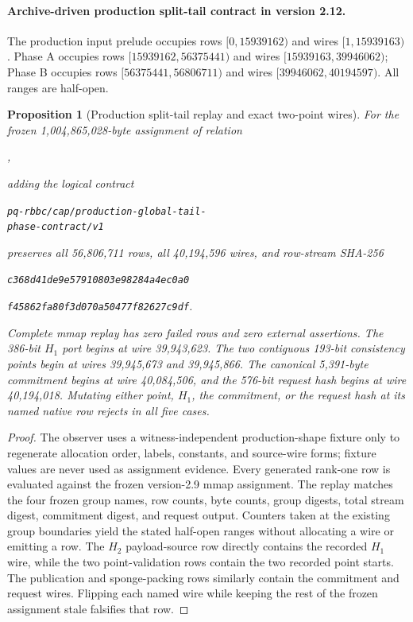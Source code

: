 \documentclass[11pt]{article}
\newtheorem{proposition}[definition]{Proposition}
\begin{document}
\paragraph{Archive-driven production split-tail contract in version 2.12.}
The production input prelude occupies rows $[0,15939162)$ and wires
$[1,15939163)$.  Phase A occupies rows $[15939162,56375441)$ and wires
$[15939163,39946062)$; Phase B occupies rows $[56375441,56806711)$ and wires
$[39946062,40194597)$.  All ranges are half-open.

\begin{proposition}[Production split-tail replay and exact two-point wires]
For the frozen 1,004,865,028-byte assignment of relation
\begin{center}
,
\end{center}
adding the logical contract
\begin{center}\small
\texttt{pq-rbbc/cap/production-global-tail-}\\
\texttt{phase-contract/v1}
\end{center}
preserves all
56,806,711 rows, all 40,194,596 wires, and row-stream SHA-256
\begin{center}\small
\texttt{c368d41de9e57910803e98284a4ec0a0}\par\vspace{-0.2em}
\texttt{f45862fa80f3d070a50477f82627c9df}.
\end{center}
Complete mmap replay has zero failed rows and zero external assertions.  The
386-bit $H_1$ port begins at wire 39,943,623.  The two contiguous 193-bit
consistency points begin at wires 39,945,673 and 39,945,866.  The canonical
5,391-byte commitment begins at wire 40,084,506, and the 576-bit request hash
begins at wire 40,194,018.  Mutating either point, $H_1$, the commitment, or
the request hash at its named native row rejects in all five cases.
\end{proposition}
\begin{proof}
The observer uses a witness-independent production-shape fixture only to
regenerate allocation order, labels, constants, and source-wire forms; fixture
values are never used as assignment evidence.  Every generated rank-one row is
evaluated against the frozen version-2.9 mmap assignment.  The replay matches
the four frozen group names, row counts, byte counts, group digests, total
stream digest, commitment digest, and request output.  Counters taken at the
existing group boundaries yield the stated half-open ranges without allocating
a wire or emitting a row.  The $H_2$ payload-source row directly contains the
recorded $H_1$ wire, while the two point-validation rows contain the two
recorded point starts.  The publication and sponge-packing rows similarly
contain the commitment and request wires.  Flipping each named wire while
keeping the rest of the frozen assignment stale falsifies that row.
\end{proof}
\end{document}
